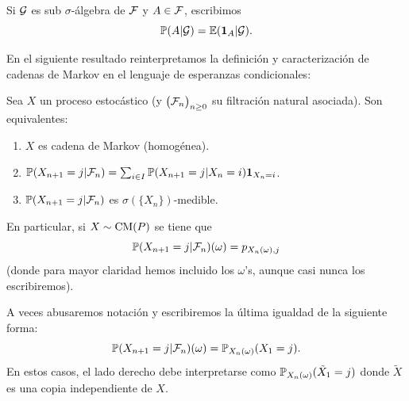\begin{notation}
Si $\mathcal{G}$ es sub $\sigma$-álgebra de $\mathcal{F}$ y $A\in\mathcal{F}$, escribimos 
\[\mathbb{P}(A|\mathcal{G})=\mathbb{E}(\mathbf{1}_{A}|\mathcal{G}).\]
\end{notation}

En el siguiente resultado reinterpretamos la definición y caracterización de cadenas de Markov en el lenguaje de esperanzas condicionales:

\begin{prop}
Sea $X$ un proceso estocástico (y $\big(\mathcal{F}_n\big)_{n\geq0}$ su filtración natural asociada).
Son equivalentes:
\begin{enumerate}[label=\uptext{(\roman*)}]
\item $X$ es cadena de Markov (homogénea).
\item $\mathbb{P}(X_{n+1}=j|\mathcal{F}_n)=\sum_{i\in I}\mathbb{P}(X_{n+1}=j|X_n=i)\mathbf{1}_{X_n=i}$.
\item $\mathbb{P}(X_{n+1}=j|\mathcal{F}_n)$ es $\sigma(\{X_n\})$-medible.
\end{enumerate}	
En particular, si $X\sim\text{\upshape{CM}}(P)$ se tiene que
\[\mathbb{P}(X_{n+1}=j|\mathcal{F}_n)(\omega)=p_{X_n(\omega),j}\]
(donde para mayor claridad hemos incluido los $\omega$'s, aunque casi nunca los escribiremos).
\end{prop}

\begin{rem}\label{rem:abusonot}
A veces abusaremos notación y escribiremos la última igualdad de la siguiente forma:
\[\mathbb{P}(X_{n+1}=j|\mathcal{F}_n)(\omega)=\mathbb{P}_{X_n(\omega)}(X_1=j).\]
En estos casos, el lado derecho debe interpretarse como $\mathbb{P}_{X_n(\omega)}(\tilde X_1=j)$ donde $\tilde X$ es una copia independiente de $X$.
\end{rem}

